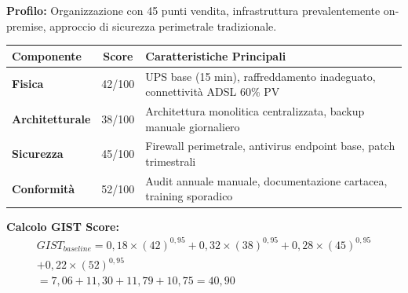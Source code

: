 \begin{tcolorbox}[
    colback=blue!5!white,
    colframe=blue!75!black,
    title={\textbf{Scenario 1:} GDO Tradizionale (Baseline)},
    fonttitle=\bfseries,
    boxrule=1.5pt,
    arc=2mm,
    breakable,
    width=\textwidth
]

\textbf{Profilo:} Organizzazione con 45 punti vendita, infrastruttura prevalentemente on-premise, approccio di sicurezza perimetrale tradizionale.

\begin{center}
\begin{tabularx}{\textwidth}{l c X}
\toprule
\textbf{Componente} & \textbf{Score} & \textbf{Caratteristiche Principali} \\
\midrule
\textbf{Fisica} & 42/100 & UPS base (15 min), raffreddamento inadeguato, connettività ADSL 60\% PV \\
\textbf{Architetturale} & 38/100 & Architettura monolitica centralizzata, backup manuale giornaliero \\
\textbf{Sicurezza} & 45/100 & Firewall perimetrale, antivirus endpoint base, patch trimestrali \\
\textbf{Conformità} & 52/100 & Audit annuale manuale, documentazione cartacea, training sporadico \\
\bottomrule
\end{tabularx}
\end{center}

\textbf{Calcolo GIST Score:}
\begin{multline}
GIST_{baseline} = 0,18 \times (42)^{0,95} + 0,32 \times (38)^{0,95} + 0,28 \times (45)^{0,95} \\+ 0,22 \times (52)^{0,95} \\
= 7,06 + 11,30 + 11,79 + 10,75 = \boxed{40,90}
\end{multline}

\end{tcolorbox}

